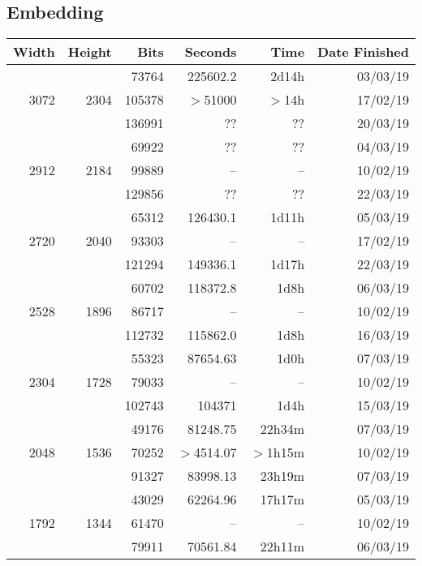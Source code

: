 \subsection{Embedding}
  \begin{center}
  \begin{tabular}{ r r r | r r r }
  Width & Height & Bits & Seconds & Time & Date Finished \\ \hline
  \multirow{3}{*}{3072} & \multirow{3}{*}{2304} & 73764 & 225602.2 & 2d14h & 03/03/19 \\
  & & 105378 & $>$51000 & $>$14h & 17/02/19 \\
  & & 136991 & ?? & ?? & 20/03/19 \\ %
  \hline
  \multirow{3}{*}{2912} & \multirow{3}{*}{2184} & 69922 & ?? & ?? & 04/03/19 \\ %
  & & 99889 & -- & -- & 10/02/19 \\ %
  & & 129856 & ?? & ?? & 22/03/19 \\ %
  \hline
  \multirow{3}{*}{2720} & \multirow{3}{*}{2040} & 65312 & 126430.1 & 1d11h & 05/03/19 \\
  & & 93303 & -- & -- & 17/02/19 \\ %
  & & 121294 & 149336.1 & 1d17h & 22/03/19 \\
  \hline
  \multirow{3}{*}{2528} & \multirow{3}{*}{1896} & 60702 & 118372.8 & 1d8h & 06/03/19 \\
  & & 86717 & -- & -- & 10/02/19 \\ %
  & & 112732 & 115862.0 & 1d8h & 16/03/19 \\
  \hline
  \multirow{3}{*}{2304} & \multirow{3}{*}{1728} & 55323 & 87654.63 & 1d0h & 07/03/19 \\
  & & 79033 & -- & -- & 10/02/19 \\ %
  & & 102743 & 104371 & 1d4h & 15/03/19 \\
  \hline
  \multirow{3}{*}{2048} & \multirow{3}{*}{1536} & 49176 & 81248.75 & 22h34m & 07/03/19 \\
  & & 70252 & $>$4514.07 & $>$1h15m & 10/02/19 \\
  & & 91327 & 83998.13 & 23h19m & 07/03/19 \\
  \hline
  \multirow{3}{*}{1792} & \multirow{3}{*}{1344} & 43029 & 62264.96 & 17h17m & 05/03/19 \\
  & & 61470 & -- & -- & 10/02/19 \\ %
  & & 79911 & 70561.84 & 22h11m & 06/03/19 \\

\end{tabular}
\end{center}

